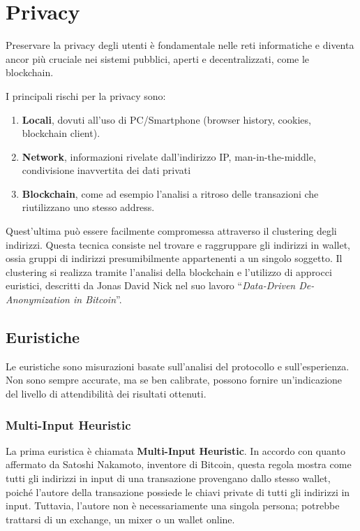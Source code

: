 \chapter{Privacy}
\newtheorem{definition}{Definition}
Preservare la privacy degli utenti è fondamentale nelle reti informatiche e diventa ancor più cruciale nei sistemi pubblici, aperti e decentralizzati, come le blockchain. 

I principali rischi per la privacy sono:
\begin{enumerate}
    \item \textbf{Locali}, dovuti all'uso di PC/Smartphone (browser history, cookies, blockchain client).
    \item \textbf{Network}, informazioni rivelate dall'indirizzo IP, man-in-the-middle, condivisione inavvertita dei dati privati
    \item \textbf{Blockchain}, come ad esempio l'analisi a ritroso delle transazioni che riutilizzano uno stesso address.
\end{enumerate}

Quest'ultima può essere facilmente compromessa attraverso il clustering degli indirizzi. Questa tecnica consiste nel trovare e raggruppare gli indirizzi in wallet, ossia gruppi di indirizzi presumibilmente appartenenti a un singolo soggetto. Il clustering si realizza tramite l'analisi della blockchain e l'utilizzo di approcci euristici, descritti da Jonas David Nick nel suo lavoro “\textit{Data-Driven De-Anonymization in Bitcoin}”.

\section{Euristiche}
Le euristiche sono misurazioni basate sull'analisi del protocollo e sull'esperienza. Non sono sempre accurate, ma se ben calibrate, possono fornire un'indicazione del livello di attendibilità dei risultati ottenuti.

\subsection{Multi-Input Heuristic}
La prima euristica è chiamata \textbf{Multi-Input Heuristic}. In accordo con quanto affermato da Satoshi Nakamoto, inventore di Bitcoin, questa regola mostra come tutti gli indirizzi in input di una transazione provengano dallo stesso wallet, poiché l'autore della transazione possiede le chiavi private di tutti gli indirizzi in input. Tuttavia, l'autore non è necessariamente una singola persona; potrebbe trattarsi di un exchange, un mixer o un wallet online.

